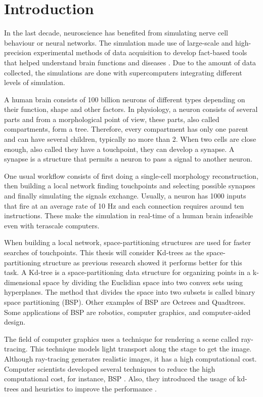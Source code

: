 \chapter{Introduction}
In the last decade, neuroscience has benefited from simulating nerve cell behaviour or neural networks. The simulation made use of large-scale and high-precision experimental methods of data acquisition to develop fact-based tools that helped understand brain functions and diseases \cite{MARKRAM201139}. Due to the amount of data collected, the simulations are done with supercomputers integrating different levels of simulation.

A human brain consists of 100 billion neurons  \cite{HERCULANO2012} of different types depending on their function, shape and other factors. In physiology, a neuron consists of several parts and from a morphological point of view, these parts, also called compartments, form a tree. Therefore, every compartment has only one parent and can have several children, typically no more than 2. When two cells are close enough, also called they have a touchpoint, they can develop a synapse. A synapse is a structure that permits a neuron to pass a signal to another neuron.

One usual workflow consists of first doing a single-cell morphology reconstruction, then building a local network finding touchpoints and selecting possible synapses \cite{Reimann2015-ys} and finally simulating the signals exchange. Usually, a neuron has 1000 inputs that fire at an average rate of 10 Hz and each connection requires around ten instructions. These make the simulation in real-time of a human brain infeasible even with terascale computers.

When building a local network, space-partitioning structures are used for faster searches of touchpoints. This thesis will consider Kd-trees as the space-partitioning structure as previous research showed it performs better for this task\cite{Adamsson_Vorkapic_2016}. A Kd-tree is a space-partitioning data structure for organizing points in a k-dimensional space by dividing the Euclidian space into two convex sets using hyperplanes. The method that divides the space into two subsets is called binary space partitioning (BSP). Other examples of BSP are Octrees and Quadtrees. Some applications of BSP are robotics, computer graphics, and computer-aided design.

The field of computer graphics uses a technique for rendering a scene called ray-tracing. This technique models light transport along the stage to get the image. Although ray-tracing generates realistic images, it has a high computational cost. Computer scientists developed several techniques to reduce the high computational cost, for instance, BSP \cite{Fuchs1980}. Also, they introduced the usage of kd-trees and heuristics to improve the performance \cite{WaldHavran06, Yucheng, LinjiaSaeidMajid, Bentley, 7169256}.


